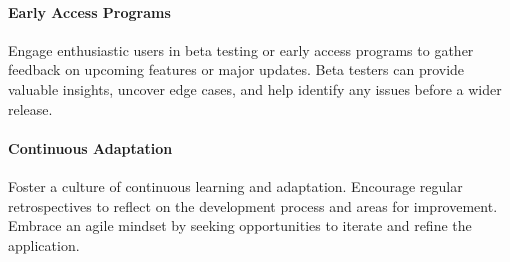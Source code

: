 \paragraph{Early Access Programs}
Engage enthusiastic users in beta testing or early access programs to gather feedback on upcoming features or 
major updates. Beta testers can provide valuable insights, uncover edge cases, and help identify any issues 
before a wider release.

\paragraph{Continuous Adaptation}
Foster a culture of continuous learning and adaptation. Encourage regular retrospectives to reflect on the development 
process and areas for improvement. Embrace an agile mindset by seeking opportunities to iterate and refine the 
application.

